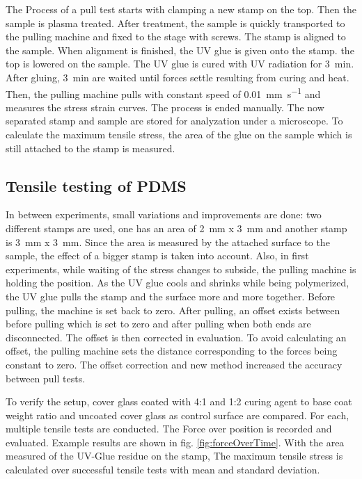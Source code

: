 The Process of a pull test starts with clamping a new stamp on the top. Then the sample is plasma treated. After treatment, the sample is quickly transported to the pulling machine and fixed to the stage with screws. The stamp is aligned to the sample. When alignment is finished, the UV glue is given onto the stamp. the top is lowered on the sample. The UV glue is cured with UV radiation for \SI{3}{\minute}. After gluing, \SI{3}{\minute} are waited until forces settle resulting from curing and heat. Then, the pulling machine pulls with constant speed of \SI{0,01}{\milli\meter\per\second} and measures the stress strain curves. The process is ended manually. The now separated stamp and sample are stored for analyzation under a microscope. To calculate the maximum tensile stress, the area of the glue on the sample which is still attached to the stamp is measured.


\subsection{Tensile testing of PDMS}

In between experiments, small variations and improvements are done: two different stamps are used, one has an area of \SI{2}{\milli\meter} x \SI{3}{\milli\meter} and another stamp is \SI{3}{\milli\meter} x \SI{3}{\milli\meter}. Since the area is measured by the attached surface to the sample, the effect of a bigger stamp is taken into account. Also, in first experiments, while waiting of the stress changes to subside, the pulling machine is holding the position. As the UV glue cools and shrinks while being polymerized, the UV glue pulls the stamp and the surface more and more together. Before pulling, the machine is set back to zero. After pulling, an offset exists between before pulling which is set to zero and after pulling when both ends are disconnected. The offset is then corrected in evaluation. To avoid calculating an offset, the pulling machine sets the distance corresponding to the forces being constant to zero. The offset correction and new method increased the accuracy between pull tests.

To verify the setup, cover glass coated with 4:1 and 1:2 curing agent to base coat weight ratio and uncoated cover glass as control surface are compared. For each, multiple tensile tests are conducted. The Force over position is recorded and evaluated. Example results are shown in fig. \ref{fig:forceOverTime}. With the area measured of the UV-Glue residue on the stamp, The maximum tensile stress is calculated over successful tensile tests with mean and standard deviation.  

